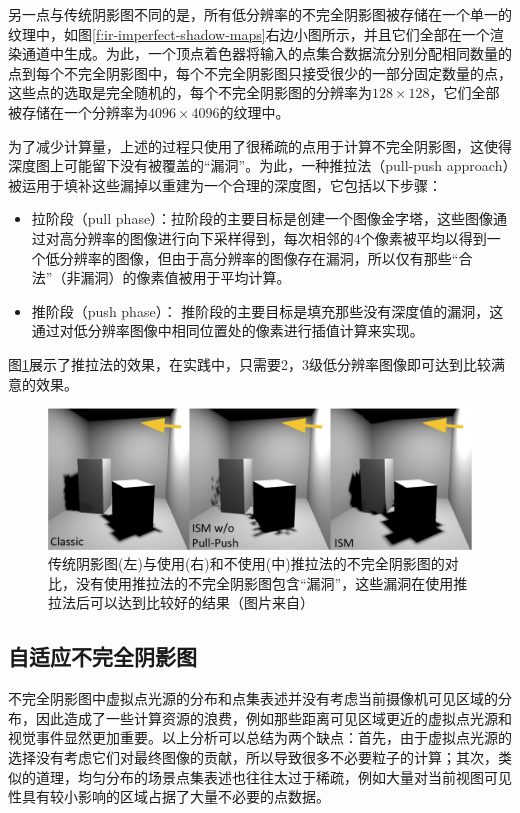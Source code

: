 另一点与传统阴影图不同的是，所有低分辨率的不完全阴影图被存储在一个单一的纹理中，如图\ref{f:ir-imperfect-shadow-maps}右边小图所示，并且它们全部在一个渲染通道中生成。为此，一个顶点着色器将输入的点集合数据流分别分配相同数量的点到每个不完全阴影图中，每个不完全阴影图只接受很少的一部分固定数量的点，这些点的选取是完全随机的，每个不完全阴影图的分辨率为$128\times 128$，它们全部被存储在一个分辨率为$4096\times 4096$的纹理中。

为了减少计算量，上述的过程只使用了很稀疏的点用于计算不完全阴影图，这使得深度图上可能留下没有被覆盖的“漏洞”。为此，一种推拉法（pull-push approach）\cite{a:PointSampleRendering,a:EfficientPointBasedRenderingUsingImageReconstruction}被运用于填补这些漏掉以重建为一个合理的深度图，它包括以下步骤：

\begin{itemize}
	\item 拉阶段（pull phase）：拉阶段的主要目标是创建一个图像金字塔，这些图像通过对高分辨率的图像进行向下采样得到，每次相邻的4个像素被平均以得到一个低分辨率的图像，但由于高分辨率的图像存在漏洞，所以仅有那些“合法”（非漏洞）的像素值被用于平均计算。 
	\item 推阶段（push phase）： 推阶段的主要目标是填充那些没有深度值的漏洞，这通过对低分辨率图像中相同位置处的像素进行插值计算来实现。
\end{itemize}

图\ref{f:ir-pull-push}展示了推拉法的效果，在实践中，只需要2，3级低分辨率图像即可达到比较满意的效果。

\begin{figure}
	\includegraphics[width=1.\textwidth]{figures/ir/ir-4-1}
	\caption{传统阴影图(左)与使用(右)和不使用(中)推拉法的不完全阴影图的对比，没有使用推拉法的不完全阴影图包含“漏洞”，这些漏洞在使用推拉法后可以达到比较好的结果（图片来自\cite{a:ImperfectShadowMapsforEfficientComputationofIndirectIllumination}）}
	\label{f:ir-pull-push}
\end{figure}




\subsection{自适应不完全阴影图}\label{sec:ir-AISM}
不完全阴影图中虚拟点光源的分布和点集表述并没有考虑当前摄像机可见区域的分布，因此造成了一些计算资源的浪费，例如那些距离可见区域更近的虚拟点光源和视觉事件显然更加重要。以上分析可以总结为两个缺点：首先，由于虚拟点光源的选择没有考虑它们对最终图像的贡献，所以导致很多不必要粒子的计算；其次，类似的道理，均匀分布的场景点集表述也往往太过于稀疏，例如大量对当前视图可见性具有较小影响的区域占据了大量不必要的点数据。

